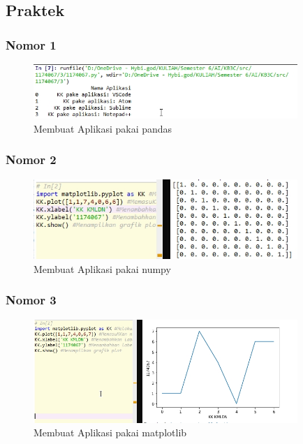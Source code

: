\subsection{Praktek}
\subsubsection{Nomor 1}
\hfill\break

\begin{figure}[H]
\centerline{\includegraphics[width=10cm]{figures/1174080/3/4.jpg}}
\caption{Membuat Aplikasi pakai pandas}
\label{labelgambar}
\end{figure}

\subsubsection{Nomor 2}
\hfill\break

\begin{figure}[H]
\centerline{\includegraphics[width=10cm]{figures/1174080/3/5.jpg}}
\caption{Membuat Aplikasi pakai numpy}
\label{labelgambar}
\end{figure}

\subsubsection{Nomor 3}
\hfill\break

\begin{figure}[H]
\centerline{\includegraphics[width=10cm]{figures/1174080/3/6.jpg}}
\caption{Membuat Aplikasi pakai matplotlib}
\label{labelgambar}
\end{figure}


